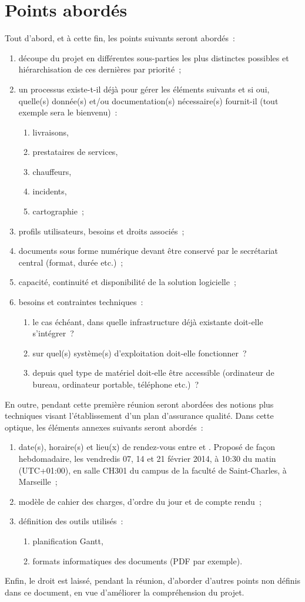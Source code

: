 \documentclass[11pt,fleqn]{report}
\begin{document}
\section{Points abordés}
Tout d'abord, et à cette fin, les points suivants seront abordés~:
\begin{enumerate}
	\item découpe du projet en différentes sous-parties les plus distinctes possibles et hiérarchisation de ces dernières par priorité~;
	\item un processus existe-t-il déjà pour gérer les éléments suivants et si oui, quelle(s) donnée(s) et/ou documentation(s) nécessaire(s) fournit-il (tout exemple sera le bienvenu)~:
	\begin{enumerate}
		\item livraisons,
		\item prestataires de services,
		\item chauffeurs,
		\item incidents,
		\item cartographie~;
	\end{enumerate}
	\item profils utilisateurs, besoins et droits associés~;
	\item documents sous forme numérique devant être conservé par le secrétariat central (format, durée etc.)~;
	\item capacité, continuité et disponibilité de la solution logicielle~;
	\item besoins et contraintes techniques~:
	\begin{enumerate}
		\item le cas échéant, dans quelle infrastructure déjà existante doit-elle s'intégrer~?
		\item sur quel(s) système(s) d'exploitation doit-elle fonctionner~?
		\item depuis quel type de matériel doit-elle être accessible (ordinateur de bureau, ordinateur portable, téléphone etc.)~?
	\end{enumerate}
\end{enumerate}
En outre, pendant cette première réunion seront abordées des notions plus techniques visant l'établissement d'un plan d'assurance qualité. Dans cette optique, les éléments annexes suivants seront abordés~:
\begin{enumerate}
	\item date(s), horaire(s) et lieu(x) de rendez-vous entre \mo et \amo. Proposé de façon hebdomadaire, les vendredis 07, 14 et 21 février 2014, à 10:30 du matin (UTC+01:00), en salle CH301 du campus de la faculté de Saint-Charles, à Marseille~;
	\item modèle de cahier des charges, d'ordre du jour et de compte rendu~;
	\item définition des outils utilisés~:
	\begin{enumerate}
		\item planification Gantt,
		\item formats informatiques des documents (PDF par exemple).
	\end{enumerate}
\end{enumerate}
Enfin, le droit est laissé, pendant la réunion, d'aborder d'autres points non définis dans  ce document, en vue d'améliorer la compréhension du projet.
\end{document}
